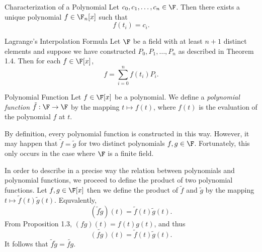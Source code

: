 \documentclass[linearalgebraII]{subfiles}
\begin{document}
    \begin{cor}{Characterization of a Polynomial}
        Let $c_0, c_1, \ldots, c_n\in \F$. Then there exists a unique polynomial $f\in \F_n[x]$ such that
        \begin{equation*}
            f(t_i) = c_i.
        \end{equation*}
    \end{cor}	

    \begin{cor}{Lagrange's Interpolation Formula}
        Let $\F$ be a field with at least $n+1$ distinct elements and suppose we have constructed $P_0, P_1, \ldots, P_n$ as described in Theorem 1.4. Then for each $f\in \F[x]$,
        \begin{equation*}
            f = \sum^{n}_{i=0} f(t_i)P_i.
        \end{equation*}
    \end{cor}	

    \begin{definition}{Polynomial Function}{}
        Let $f\in \F[x]$ be a polynomial. We define a \emph{polynomial function} $\tilde{f}:\F\to\F$ by the mapping $t\mapsto f(t)$, where $f(t)$ is the evaluation of the polynomial $f$ at $t$.
    \end{definition}

    \begin{remark}
        By definition, every polynomial function is constructed in this way. However, it may happen that $\tilde{f}=\tilde{g}$ for two distinct polynomials $f,g\in \F$. Fortunately, this only occurs in the case where $\F$ is a finite field.
    \end{remark}

    \begin{remark}
        In order to describe in a precise way the relation between polynomials and polynomial functions, we proceed to define the product of two polynomial functions. Let $f,g\in\F[x]$ then we define the product of $\tilde{f}$ and $\tilde{g}$ by the mapping $t\mapsto \tilde{f}(t)\tilde{g}(t)$. Equvalently,
        \begin{equation*}
            \left( \tilde{f}\tilde{g} \right)(t) = \tilde{f}(t)\tilde{g}(t).
        \end{equation*}
        From Proposition 1.3, $(fg)(t) = f(t)g(t)$, and thus
        \begin{equation*}
            \widetilde{(fg)}(t) = \tilde{f}(t)\tilde{g}(t).
        \end{equation*}
        It follows that $\tilde{f}\tilde{g} = \widetilde{fg}$.
    \end{remark}
\end{document}
